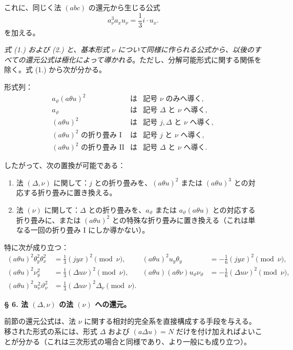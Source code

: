 \documentclass[11pt]{article}
\newcommand{\A}{\Delta}
\begin{document}
これに、同じく法 $(abc)$ の還元から生じる公式
\[
a_\nu^3a_xu_\nu=\frac13 i\cdot u_x. \tag{2}
\]
を加える。

\emph{式 (1.) および (2.) と、基本形式 $\nu$ について同様に作られる公式から、以後のすべての還元公式は極化によって導かれる}。ただし、分解可能形式に関する関係を除く。式 (1.) から次が分かる。

形式列：
\[
\begin{array}{rcl}
a_\vartheta(a\theta u)^2 &\text{は}& \text{記号 }\nu\text{ のみへ導く},\\[0.2em]
a_\vartheta &\text{は}& \text{記号 }\A\text{ と }\nu\text{ へ導く},\\[0.2em]
(a\theta u)^2 &\text{は}& \text{記号 }j,\A\text{ と }\nu\text{ へ導く},\\[0.2em]
(a\theta u)^2\text{ の折り畳み I} &\text{は}& \text{記号 }j\text{ と }\nu\text{ へ導く},\\[0.2em]
(a\theta u)^2\text{ の折り畳み II} &\text{は}& \text{記号 }\A\text{ と }\nu\text{ へ導く}.
\end{array}
\]

したがって、次の置換が可能である：
\begin{enumerate}
\item 法 $(\A,\nu)$ に関して：$j$ との折り畳みを、$(a\theta u)^2$ または $(a\theta u)^3$ との対応する折り畳みに置き換える。
\item 法 $(\nu)$ に関して：$\A$ との折り畳みを、$a_\vartheta$ または $a_\vartheta(a\theta u)$ との対応する折り畳みに、または $(a\theta u)^2$ との特殊な折り畳みに置き換える（これは単なる一回の折り畳み I にしか導かない）。
\end{enumerate}
特に次が成り立つ：
\[
\begin{aligned}
(a\theta u)^2\theta_y^2\theta_x^2&=\frac13(jyx)^2\pmod{\nu},&
(a\theta u)^2u_y\theta_y&=-\frac16(jyx)^2\pmod{\nu},\\
(a\theta u)^2\nu_y^2&=\frac13(\A u\nu)^2\pmod{\nu},&
(a\theta u)(a\theta\nu)u_\vartheta\nu_\vartheta&=-\frac16(\A u\nu)^2\pmod{\nu},\\
(a\theta u)^2u_\nu^2\vartheta_\nu^2&=\frac13(\A u\nu)^2\A_\nu\pmod{\nu}.
\end{aligned}
\]

\begin{center}
\textbf{§ 6. \quad 法 $(\A,\nu)$ の法 $(\nu)$ への還元。}
\end{center}

前節の還元公式は、法 $\nu$ に関する相対的完全系を直接構成する手段を与える。移された形式の系には、形式 $\A$ および $(a\A u)=N$ だけを付け加えればよいことが分かる（これは三次形式の場合と同様であり、より一般にも成り立つ）。
\end{document}
